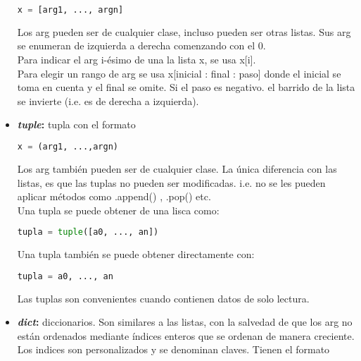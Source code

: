 \documentclass[10pt,oneside]{article}
\begin{document}
\begin{multicols}{2}
\begin{itemize}
                \begin{lstlisting}[language=Python]
x = [arg1, ..., argn]
                \end{lstlisting}
                
                Los arg pueden ser de cualquier clase, incluso pueden ser otras listas. Sus arg se enumeran de izquierda a derecha comenzando con el 0.\\ \newline * Para indicar el arg i-ésimo de una la lista x, se usa x[i]. \\ \newline * Para elegir un rango de arg se usa x[inicial : final : paso]  donde el inicial se toma en cuenta y el final se omite. Si el paso es negativo. el barrido de la lista se invierte (i.e. es de derecha a izquierda).
                \item \textbf{\textit{tuple}:} tupla con el formato

                \begin{lstlisting}[language=Python]
x = (arg1, ...,argn)   
                \end{lstlisting}
                
                Los arg también pueden ser de cualquier clase. La única diferencia con las listas, es que las tuplas no pueden ser modificadas. i.e. no se les pueden aplicar métodos como .append() , .pop() etc.\\ Una tupla se puede obtener de una lisca como:

                \begin{lstlisting}[language=Python]
tupla = tuple([a0, ..., an])                    
                \end{lstlisting}

                Una tupla también se puede obtener directamente con:
                
                \begin{lstlisting}[language=Python]
tupla = a0, ..., an                    
                \end{lstlisting}

                Las tuplas son convenientes cuando contienen datos de solo lectura. 
                
                \item \textbf{\textit{dict}:} diccionarios. Son similares a las listas, con la salvedad de que los arg no están ordenados mediante índices enteros que se ordenan de manera creciente. Los indices son personalizados y se denominan claves. Tienen el formato 
                

\end{itemize}
\end{multicols}
\end{document}
